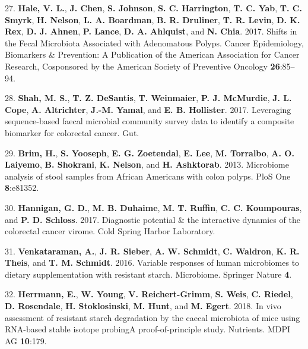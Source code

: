 \documentclass[12pt,]{article}
\begin{document}
\hypertarget{ref-hale_shifts_2017}{}
27. \textbf{Hale, V. L.}, \textbf{J. Chen}, \textbf{S. Johnson},
\textbf{S. C. Harrington}, \textbf{T. C. Yab}, \textbf{T. C. Smyrk},
\textbf{H. Nelson}, \textbf{L. A. Boardman}, \textbf{B. R. Druliner},
\textbf{T. R. Levin}, \textbf{D. K. Rex}, \textbf{D. J. Ahnen},
\textbf{P. Lance}, \textbf{D. A. Ahlquist}, and \textbf{N. Chia}. 2017.
Shifts in the Fecal Microbiota Associated with Adenomatous Polyps.
Cancer Epidemiology, Biomarkers \& Prevention: A Publication of the
American Association for Cancer Research, Cosponsored by the American
Society of Preventive Oncology \textbf{26}:85--94.

\hypertarget{ref-shah_leveraging_2017}{}
28. \textbf{Shah, M. S.}, \textbf{T. Z. DeSantis}, \textbf{T.
Weinmaier}, \textbf{P. J. McMurdie}, \textbf{J. L. Cope}, \textbf{A.
Altrichter}, \textbf{J.-M. Yamal}, and \textbf{E. B. Hollister}. 2017.
Leveraging sequence-based faecal microbial community survey data to
identify a composite biomarker for colorectal cancer. Gut.

\hypertarget{ref-brim_microbiome_2013}{}
29. \textbf{Brim, H.}, \textbf{S. Yooseph}, \textbf{E. G. Zoetendal},
\textbf{E. Lee}, \textbf{M. Torralbo}, \textbf{A. O. Laiyemo},
\textbf{B. Shokrani}, \textbf{K. Nelson}, and \textbf{H. Ashktorab}.
2013. Microbiome analysis of stool samples from African Americans with
colon polyps. PloS One \textbf{8}:e81352.

\hypertarget{ref-Hannigan2017}{}
30. \textbf{Hannigan, G. D.}, \textbf{M. B. Duhaime}, \textbf{M. T.
Ruffin}, \textbf{C. C. Koumpouras}, and \textbf{P. D. Schloss}. 2017.
Diagnostic potential \& the interactive dynamics of the colorectal
cancer virome. Cold Spring Harbor Laboratory.

\hypertarget{ref-Venkataraman2016}{}
31. \textbf{Venkataraman, A.}, \textbf{J. R. Sieber}, \textbf{A. W.
Schmidt}, \textbf{C. Waldron}, \textbf{K. R. Theis}, and \textbf{T. M.
Schmidt}. 2016. Variable responses of human microbiomes to dietary
supplementation with resistant starch. Microbiome. Springer Nature
\textbf{4}.

\hypertarget{ref-Herrmann2018}{}
32. \textbf{Herrmann, E.}, \textbf{W. Young}, \textbf{V.
Reichert-Grimm}, \textbf{S. Weis}, \textbf{C. Riedel}, \textbf{D.
Rosendale}, \textbf{H. Stoklosinski}, \textbf{M. Hunt}, and \textbf{M.
Egert}. 2018. In vivo assessment of resistant starch degradation by the
caecal microbiota of mice using RNA-based stable isotope probingA
proof-of-principle study. Nutrients. MDPI AG \textbf{10}:179.
\end{document}
